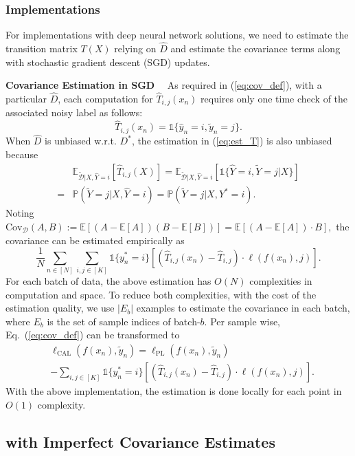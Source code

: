 \documentclass[final]{cvpr}
\newcommand{\estD}{{\hat D}}
\newcommand{\PP}{\mathbb P}
\newcommand{\BR}{\mathds 1}
\newcommand{\E}{\mathbb E}
\newcommand{\rev}[1]{{\color{blue}#1}}
\newcommand{\rev}[1]{#1}
\newcommand{\covpeer}{\text{CAL}}
\begin{document}
\subsubsection{Implementations}

For implementations with deep neural network solutions, we need to estimate the transition matrix $T(X)$ relying on $\estD$ and estimate the covariance terms along with stochastic gradient descent (SGD) updates.

\noindent\textbf{Covariance Estimation in SGD}~~
As required in (\ref{eq:cov_def}), with a particular $\estD$, \rev{each computation for $\hat T_{i,j}(x_n)$ requires only one time check of the associated noisy label} as follows:
\begin{equation}\label{eq:est_T}
    \hat T_{i,j}(x_n) = \BR\{ \hat y_n = i, \tilde y_n = j \}. 
\end{equation}
When $\estD$ is unbiased w.r.t. $D^*$, the estimation in (\ref{eq:est_T}) is also unbiased because
\begin{align*}
   & \E_{\widetilde{\mathcal D}|X, \hat Y=i}[\hat T_{i,j}(X)]  
  =  \E_{\widetilde{\mathcal D}|X, \hat Y=i}[\BR\{ \hat Y = i, \widetilde Y = j| X \}] \\
  = & \PP(\widetilde Y = j| X, \hat Y = i)   =  \PP(\widetilde Y = j| X, Y^* = i).
\end{align*}
Noting $\text{Cov}_{\mathcal D}(A,B):=\E[(A-\E[A])(B-\E[B])] = \E[(A-\E[A])\cdot B],$
the covariance can be estimated empirically as
\[
\frac{1}{N}\sum_{n\in[N]}\sum_{i,j \in [K]}   \BR\{y_n^*=i\} \left[(\hat T_{i,j}(x_n) - \hat T_{i,j}) \cdot \ell (f(x_n), j) \right].
\]
\rev{For each batch of data, the above estimation has $O(N)$ complexities in computation and space. To reduce
both complexities, with the cost of the estimation quality, we use $|E_b|$ examples to estimate the covariance in each batch, where $E_b$ is the set of sample indices of batch-$b$. Per sample wise, Eq.~(\ref{eq:cov_def}) can be transformed to}
\begin{equation*}\begin{split}
        &\ell_{\covpeer} (f(x_n),\tilde y_n) =  {\ell_{\text{PL}}} (f(x_n),\tilde y_n) \\
        & -  \sum_{i,j\in[K]}  \BR\{y_n^*=i\} \left[(\hat T_{i,j}(x_n) - \hat T_{i,j}) \cdot \ell (f(x_n), j) \right].
    \end{split}
\end{equation*}
\rev{With the above implementation, the estimation is done locally for each point in $O(1)$ complexity.}
\subsection{\covpeer{} with Imperfect Covariance Estimates} 
\label{sec:imperfectCov}
\end{document}
